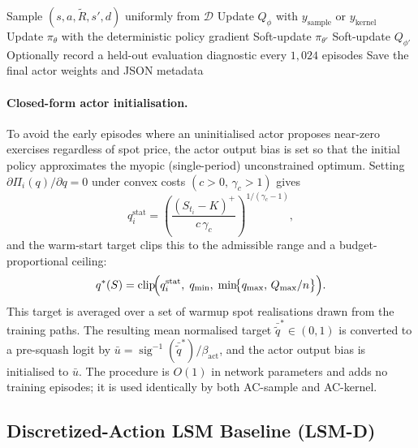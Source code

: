 \documentclass[a4paper,fleqn]{cas-dc}
\begin{document}
\begin{algorithm}[htbp]
\begin{algorithmic}[1]
        \State Sample $(s,a,\tilde R,s',d)$ uniformly from $\mathcal{D}$
        \State Update $Q_\phi$ with $y_{\mathrm{sample}}$ or $y_{\mathrm{kernel}}$
        \State Update $\pi_\theta$ with the deterministic policy gradient
        \State Soft-update $\pi_{\theta'}$
        \EndIf
        \State Soft-update $Q_{\phi'}$
        \EndIf
        \EndFor
        \State Optionally record a held-out evaluation diagnostic every $1{,}024$ episodes
        \EndFor
        \State Save the final actor weights and JSON metadata
    \end{algorithmic}
\end{algorithm}

\paragraph{Closed-form actor initialisation.}
To avoid the early episodes where an uninitialised actor proposes near-zero exercises regardless of spot price, the actor output bias is set so that the initial policy approximates the myopic (single-period) unconstrained optimum. Setting $\partial\Pi_i(q)/\partial q = 0$ under convex costs $(c>0,\,\gamma_c>1)$ gives
\begin{equation}
    \label{eq:myopic_stationary}
    q_i^{\mathrm{stat}} = \left(\frac{(S_{t_i}-K)^+}{c\,\gamma_c}\right)^{1/(\gamma_c-1)},
\end{equation}
and the warm-start target clips this to the admissible range and a budget-proportional ceiling:
\begin{equation}
    \label{eq:warmstart_target}
    q^*(S)
    =
    \operatorname{clip}\!\Bigl(
        q_i^{\mathrm{stat}},\;
        q_{\min},\;
        \min\!\bigl\{q_{\max},\,Q_{\max}/n\bigr\}
    \Bigr).
\end{equation}
This target is averaged over a set of warmup spot realisations drawn from the training paths. The resulting mean normalised target $\bar{\tilde{q}}^* \in (0,1)$ is converted to a pre-squash logit by $\bar u = \operatorname{sig}^{-1}(\bar{\tilde{q}}^*)/\beta_{\mathrm{act}}$, and the actor output bias is initialised to $\bar u$. The procedure is $O(1)$ in network parameters and adds no training episodes; it is used identically by both AC-sample and AC-kernel.

\subsection{Discretized-Action LSM Baseline (LSM-D)}
\label{sec:lsm}
\end{document}
